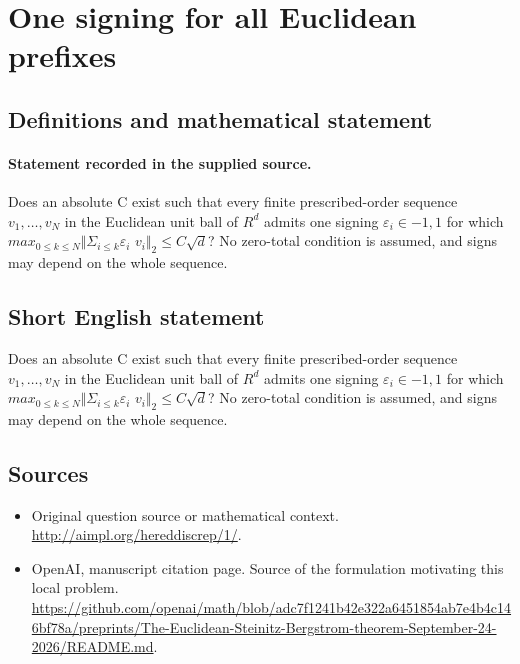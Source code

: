 \documentclass[11pt]{article}
\begin{document}
\section*{One signing for all Euclidean prefixes}\label{statement}
\subsection{Definitions and mathematical statement}
\paragraph{Statement recorded in the supplied source.}
Does an absolute C exist such that every finite prescribed-order sequence $v_{1},\dots ,v_N$ in the Euclidean unit ball of $R^{d}$ admits one signing $\varepsilon _i\in {-1,1}$ for which $max_{0\leq k\leq N}\Vert \Sigma _{i\leq k}\varepsilon _i$ $v_i\Vert _{2}\leq C\surd d$? No zero-total condition is assumed, and signs may depend on the whole sequence.
\subsection{Short English statement}
Does an absolute C exist such that every finite prescribed-order sequence $v_{1},\dots ,v_N$ in the Euclidean unit ball of $R^{d}$ admits one signing $\varepsilon _i\in {-1,1}$ for which $max_{0\leq k\leq N}\Vert \Sigma _{i\leq k}\varepsilon _i$ $v_i\Vert _{2}\leq C\surd d$? No zero-total condition is assumed, and signs may depend on the whole sequence.
\subsection{Sources}
\begin{itemize}
\item[S1] Original question source or mathematical context.
\url{http://aimpl.org/hereddiscrep/1/}.
\item[S2] OpenAI, manuscript citation page. Source of the formulation motivating this local problem.
\url{https://github.com/openai/math/blob/adc7f1241b42e322a6451854ab7e4b4c146bf78a/preprints/The-Euclidean-Steinitz-Bergstrom-theorem-September-24-2026/README.md}.
\end{itemize}
\end{document}
